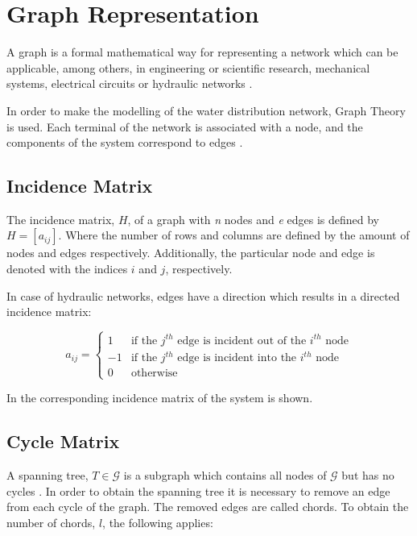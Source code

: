 \section{Graph Representation}  
\label{GraphTheory}
A graph is a formal mathematical way for representing a network which can be applicable, among others, 
in engineering or scientific research, mechanical systems, electrical circuits or hydraulic networks \cite{graph_intro}. 

In order to make the modelling of the water distribution network, Graph Theory is used. 
Each terminal of the network is associated with a node, and the components of the system correspond to edges \cite{GraphTheoryCarsten}. 
\subsection{Incidence Matrix} 
\label{IncidenceSection}
The incidence matrix, $H$, of a graph with \textit{n} nodes and \textit{e} edges is 
defined by $H = [a_{ij}]$. Where the number of rows and columns are defined by the amount of nodes and edges respectively. 
Additionally, the particular node and edge is denoted with the indices $i$ and 
$j$, respectively.

In case of hydraulic networks, edges have a direction which results in a directed incidence matrix:

\begin{equation}
\label{DiGraph}
 a_{ij} =
		\left\{
		\begin{array}{ll}
		
		1 			&      \text{if the $j^{th}$ edge is incident out of the $i^{th}$ node}	
\\
		-1                       &     \text{if the $j^{th}$ edge is incident into the $i^{th}$ node}
\\


                0                       &      \text{otherwise}

		\end{array}
		\right.
\end{equation}	

In  the corresponding incidence matrix of the system is 
shown. 

\subsection{Cycle Matrix}
\label{CycleSection}
A spanning tree, $T \in \mathcal{G}$ is a subgraph which contains all nodes of $\mathcal{G}$ but has no cycles \cite{GraphModel}. 
In order to obtain the spanning tree it is necessary to remove an edge from each cycle of the graph. The removed edges are called chords. To obtain the number of chords, $l$, the following applies:

